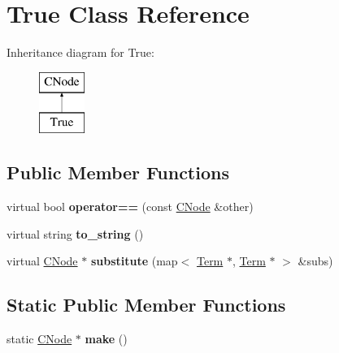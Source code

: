 \hypertarget{classTrue}{\section{\-True \-Class \-Reference}
\label{classTrue}
}
\-Inheritance diagram for \-True\-:\begin{figure}[H]
\begin{center}
\leavevmode
\includegraphics[height=2.000000cm]{classTrue}
\end{center}
\end{figure}
\subsection*{\-Public \-Member \-Functions}
\begin{DoxyCompactItemize}
\item 
\hypertarget{classTrue_a010be15891ada56b4fee29d56089f177}{virtual bool {\bfseries operator==} (const \hyperlink{classCNode}{\-C\-Node} \&other)}\label{classTrue_a010be15891ada56b4fee29d56089f177}

\item 
\hypertarget{classTrue_a73d36085cd7162481960115489437f64}{virtual string {\bfseries to\-\_\-string} ()}\label{classTrue_a73d36085cd7162481960115489437f64}

\item 
\hypertarget{classTrue_aa8bb181553bce8aeec1962862d8d8564}{virtual \hyperlink{classCNode}{\-C\-Node} $\ast$ {\bfseries substitute} (map$<$ \hyperlink{classTerm}{\-Term} $\ast$, \hyperlink{classTerm}{\-Term} $\ast$ $>$ \&subs)}\label{classTrue_aa8bb181553bce8aeec1962862d8d8564}

\end{DoxyCompactItemize}
\subsection*{\-Static \-Public \-Member \-Functions}
\begin{DoxyCompactItemize}
\item 
\hypertarget{classTrue_ada3b9d8de5887454efeeaa0e43576a01}{static \hyperlink{classCNode}{\-C\-Node} $\ast$ {\bfseries make} ()}\label{classTrue_ada3b9d8de5887454efeeaa0e43576a01}

\end{DoxyCompactItemize}
